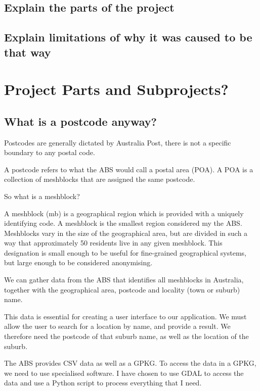 \documentclass[12pt,a4paper]{report}
\begin{document}
\subsection{Explain the parts of the project}

\subsection{Explain limitations of why it was caused to be that way}

\section{Project Parts and Subprojects?}

\subsection{What is a postcode anyway?}

Postcodes are generally dictated by Australia Post, there is not a specific boundary to any postal code.

A postcode refers to what the ABS would call a postal area (POA). A POA is a collection of meshblocks that are assigned the same postcode. 

So what is a meshblock?

A meshblock (mb) is a geographical region which is provided with a uniquely identifying code. A meshblock is the smallest region considered my the ABS. Meshblocks vary in the size of the geographical area, but are divided in such a way that approximately 50 residents live in any given meshblock. This designation is small enough to be useful for fine-grained geographical systems, but large enough to be considered anonymising. 

We can gather data from the ABS that identifies all meshblocks in Australia, together with the geographical area, postcode and locality (town or suburb) name.

This data is essential for creating a user interface to our application. We must allow the user to search for a location by name, and provide a result. We therefore need the postcode of that suburb name, as well as the location of the suburb.

The ABS provides CSV data as well as a GPKG. To access the data in a GPKG, we need to use specialised software. I have chosen to use GDAL to access the data and use a Python script to process everything that I need. 
\end{document}
